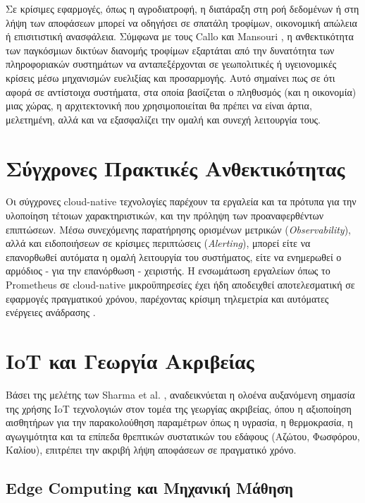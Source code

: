 Σε κρίσιμες εφαρμογές, όπως η αγροδιατροφή, η διατάραξη στη ροή δεδομένων ή στη λήψη των αποφάσεων μπορεί να οδηγήσει σε σπατάλη τροφίμων, οικονομική απώλεια ή επισιτιστική ανασφάλεια. Σύμφωνα με τους Callo και Mansouri \cite{foodsec}, η ανθεκτικότητα των παγκόσμιων δικτύων διανομής τροφίμων εξαρτάται από την δυνατότητα των πληροφοριακών συστημάτων να ανταπεξέρχονται σε γεωπολιτικές ή υγειονομικές κρίσεις μέσω μηχανισμών ευελιξίας και προσαρμογής. Αυτό σημαίνει πως σε ότι αφορά σε αντίστοιχα συστήματα, στα οποία βασίζεται ο πληθυσμός (και η οικονομία) μιας χώρας, η αρχιτεκτονική που χρησιμοποιείται θα πρέπει να είναι άρτια, μελετημένη, αλλά και να εξασφαλίζει την ομαλή και συνεχή λειτουργία τους.

\section{Σύγχρονες Πρακτικές Ανθεκτικότητας}

Οι σύγχρονες cloud-native τεχνολογίες παρέχουν τα εργαλεία και τα πρότυπα για την υλοποίηση τέτοιων χαρακτηριστικών, και την πρόληψη των προαναφερθέντων επιπτώσεων. Μέσω συνεχόμενης παρατήρησης ορισμένων μετρικών (\textit{Observability}), αλλά και ειδοποιήσεων σε κρίσιμες περιπτώσεις (\textit{Alerting}), μπορεί είτε να επανορθωθεί αυτόματα η ομαλή λειτουργία του συστήματος, είτε να ενημερωθεί ο αρμόδιος - για την επανόρθωση - χειριστής. Η ενσωμάτωση εργαλείων όπως το Prometheus σε cloud-native μικροϋπηρεσίες έχει ήδη αποδειχθεί αποτελεσματική σε εφαρμογές πραγματικού χρόνου, παρέχοντας κρίσιμη τηλεμετρία και αυτόματες ενέργειες ανάδρασης \cite{iotmonitoring}.

\section{IoT και Γεωργία Ακριβείας}

Βάσει της μελέτης των Sharma et al. \cite{iotagriculture}, αναδεικνύεται η ολοένα αυξανόμενη σημασία της χρήσης IoT τεχνολογιών στον τομέα της γεωργίας ακριβείας, όπου η αξιοποίηση αισθητήρων για την παρακολούθηση παραμέτρων όπως η υγρασία, η θερμοκρασία, η αγωγιμότητα και τα επίπεδα θρεπτικών συστατικών του εδάφους (Αζώτου, Φωσφόρου, Καλίου), επιτρέπει την ακριβή λήψη αποφάσεων σε πραγματικό χρόνο.

\subsection{Edge Computing και Μηχανική Μάθηση}

